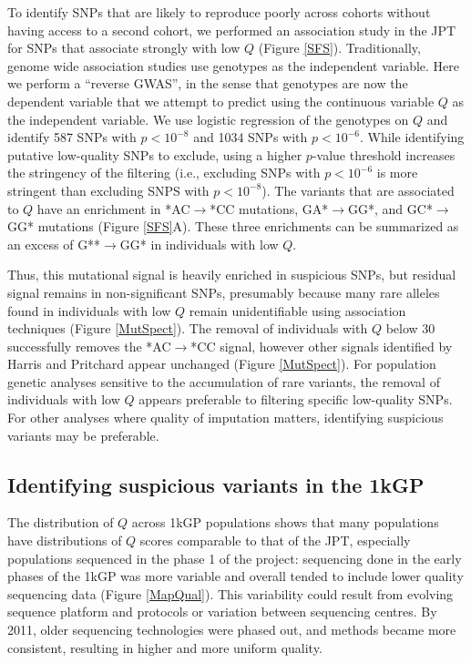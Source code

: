 \documentclass[9pt,lineno]{elife}
\begin{document}
To identify SNPs that are likely to reproduce poorly across cohorts without having access to a second cohort, we performed an association study in the JPT for SNPs that associate strongly with low $Q$ (Figure \ref{SFS}).
Traditionally, genome wide association studies use genotypes as the independent variable. 
Here we perform a ``reverse GWAS'', in the sense that genotypes are now the dependent variable that we attempt to predict using the continuous variable $Q$ as the independent variable.
We use logistic regression of the genotypes on $Q$ and identify 587 SNPs with $p < 10^{-8}$ and 1034 SNPs with $ p < 10^{-6}$. 
While identifying putative low-quality SNPs to exclude, using a higher $p$-value threshold increases the stringency of the filtering (i.e., excluding SNPs with $ p < 10^{-6}$ is more stringent than excluding SNPS with $p < 10^{-8}$). 
The variants that are associated to $Q$ have an enrichment in *AC${\rightarrow}$*CC mutations, GA*${\rightarrow}$GG*, and GC*${\rightarrow}$GG* mutations (Figure \ref{SFS}A).
These three enrichments can be summarized as an excess of G**${\rightarrow}$GG* in individuals with low $Q$.

Thus, this mutational signal is heavily enriched in suspicious SNPs, but residual signal remains in non-significant SNPs, presumably because many rare alleles found in individuals with low $Q$ remain unidentifiable using association techniques (Figure \ref{MutSpect}). The removal of individuals with $Q$ below 30 successfully removes the *AC${\rightarrow}$*CC signal, however other signals identified by Harris and Pritchard appear unchanged (Figure \ref{MutSpect}).
For population genetic analyses sensitive to the accumulation of rare variants, the removal of individuals with low $Q$ appears preferable to filtering specific low-quality SNPs. 
For other analyses where quality of imputation matters, identifying suspicious variants may be preferable. 


\subsection{Identifying suspicious variants in the 1kGP}
The distribution of $Q$ across 1kGP populations shows that many populations have distributions of $Q$ scores comparable to that of the JPT, especially populations sequenced in the phase 1 of the project: sequencing done in the early phases of the 1kGP was more variable and overall tended to include lower quality sequencing data (Figure \ref{MapQual}).
This variability could result from evolving sequence platform and protocols or variation between sequencing centres. 
By 2011, older sequencing technologies were phased out, and methods became more consistent, resulting in higher and more uniform quality.
\end{document}
